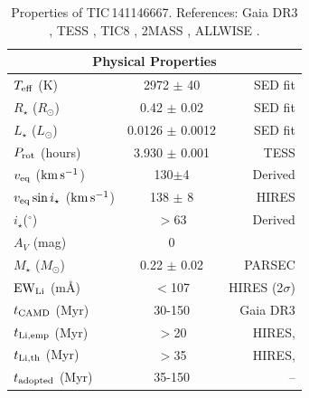 \documentclass[11pt,twocolumn,tighten,linenumbers]{aastex7}
\newcommand{\kms}{\ensuremath{\rm km\,s^{-1}}}
\begin{document}
\begin{table}
\begin{tabular}{lcr}
    \hline
    \multicolumn{3}{c}{Physical Properties} \\
    \hline
    $T_{\rm eff}$ (K) & 2972 $\pm$ 40 & SED fit \\
    $R_\star$ ($R_{\odot}$) & 0.42 $\pm$ 0.02 & SED fit  \\
    $L_\star$ ($L_\odot$) & 0.0126 $\pm$ 0.0012 & SED fit \\
    $P_{\rm rot}$ (hours) & 3.930 $\pm$ 0.001 & TESS \\ 
    $v_{\rm eq}$ (\kms)  &  130$\pm$4  & Derived \\
    $v_{\rm eq} \sin i_\star$ (\kms) & 138 $\pm$ 8 & HIRES \\
    $i_\star$($^\circ$) & $>$63 & Derived \\
    $A_V$ (mag) & 0 & \citep{Green2019} \\
    $M_\star$ ($M_{\odot}$)  & 0.22 $\pm$ 0.02  & PARSEC \citep{Chen2014}\\
    ${\rm EW}_{\rm Li}$ (m\AA) & $<$107 & HIRES (2$\sigma$)\\
    $t_{\rm CAMD}$ (Myr) & 30-150 &  Gaia DR3 \\
    $t_{\rm Li,emp}$ (Myr) & $>$20 &  HIRES, \citep{Jeffries2023} \\
    $t_{\rm Li,th}$ (Myr) & $>$35 &  HIRES, \citep{Feiden2016} \\
    $t_{\rm adopted}$ (Myr) & 35-150 &  -- \\
    \hline
    \end{tabular}
		\caption{Properties of TIC\,141146667.  References:
    Gaia DR3 \citep{GaiaDR3}, TESS \citep{Ricker2015},
    TIC8 \citep{Stassun2019}, 2MASS \citep{Skrutskie2006}, ALLWISE
    \citep{Cutri2014}.}
    \label{tab:stparams}
\end{table}
\end{document}
